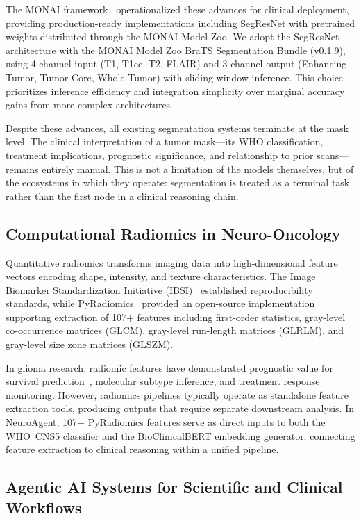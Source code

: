 \documentclass[journal]{IEEEtran}
\begin{document}
The MONAI framework~\cite{monai2023} operationalized these advances for
clinical deployment, providing production-ready implementations including
SegResNet with pretrained weights distributed through the MONAI Model Zoo.
We adopt the SegResNet architecture with the MONAI Model Zoo BraTS
Segmentation Bundle (v0.1.9), using 4-channel input (T1, T1ce, T2, FLAIR)
and 3-channel output (Enhancing Tumor, Tumor Core, Whole Tumor) with
sliding-window inference. This choice prioritizes inference efficiency
and integration simplicity over marginal accuracy gains from more complex
architectures.

Despite these advances, all existing segmentation systems terminate at the
mask level. The clinical interpretation of a tumor mask---its WHO
classification, treatment implications, prognostic significance, and
relationship to prior scans---remains entirely manual. This is not a
limitation of the models themselves, but of the ecosystems in which they
operate: segmentation is treated as a terminal task rather than the first
node in a clinical reasoning chain.

\subsection{Computational Radiomics in Neuro-Oncology}

Quantitative radiomics transforms imaging data into high-dimensional
feature vectors encoding shape, intensity, and texture characteristics.
The Image Biomarker Standardization Initiative
(IBSI)~\cite{zwanenburg2020} established reproducibility standards, while
PyRadiomics~\cite{vangriethuysen2017} provided an open-source
implementation supporting extraction of 107+ features including first-order
statistics, gray-level co-occurrence matrices (GLCM), gray-level
run-length matrices (GLRLM), and gray-level size zone matrices (GLSZM).

In glioma research, radiomic features have demonstrated prognostic value
for survival prediction~\cite{kickingereder2016}, molecular subtype
inference, and treatment response monitoring. However, radiomics pipelines
typically operate as standalone feature extraction tools, producing outputs
that require separate downstream analysis. In NeuroAgent, 107+ PyRadiomics
features serve as direct inputs to both the WHO~CNS5 classifier and the
BioClinicalBERT embedding generator, connecting feature extraction to
clinical reasoning within a unified pipeline.

\subsection{Agentic AI Systems for Scientific and Clinical Workflows}
\end{document}
